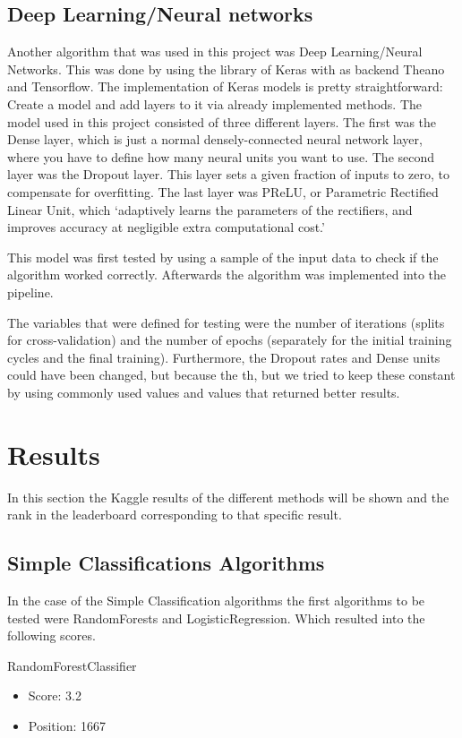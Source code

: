 \documentclass[runningheads,a4paper]{llncs}
\begin{document}
\subsection{Deep Learning/Neural networks}

Another algorithm that was used in this project was Deep Learning/Neural Networks. This was done by using the library of Keras with as backend Theano and Tensorflow.\medskip
The implementation of Keras models is pretty straightforward: Create a model and add layers to it via already implemented methods. The model used in this project consisted of three different layers. The first was the Dense layer, which is just a normal densely-connected neural network layer, where you have to define how many neural units you want to use. The second layer was the Dropout layer. This layer sets a given fraction of inputs to zero, to compensate for overfitting. The last layer was PReLU, or Parametric Rectified Linear Unit, which `adaptively learns the parameters of the rectifiers, and improves accuracy at negligible extra computational cost.' \cite{PReLU}\medskip

This model was first tested by using a sample of the input data to check if the algorithm worked correctly. Afterwards the algorithm was implemented into the pipeline.\medskip 

The variables that were defined for testing were the number of iterations (splits for cross-validation) and the number of epochs (separately for the initial training cycles and the final training). Furthermore, the Dropout rates and Dense units could have been changed, but because the th, but we tried to keep these constant by using commonly used values and values that returned better results.

\section{Results}
In this section the Kaggle results of the different methods will be shown and the rank in the leaderboard corresponding to that specific result.

\subsection{Simple Classifications Algorithms}
In the case of the Simple Classification algorithms the first algorithms to be tested were RandomForests and LogisticRegression. Which resulted into the following scores. \medskip 

RandomForestClassifier
\begin{itemize}
    \item Score: 3.2
    \item Position: 1667
\end{itemize}
\end{document}
